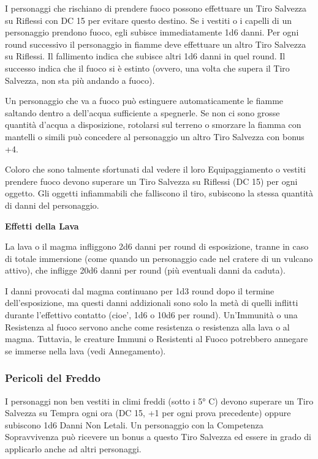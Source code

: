 \documentclass[a4paper,11pt,twoside,openany]{book}
\begin{document}
I personaggi che rischiano di prendere fuoco possono effettuare un Tiro Salvezza su Riflessi con DC 15 per evitare questo destino. Se i vestiti o i capelli di un personaggio prendono fuoco, egli subisce immediatamente 1d6 danni. Per ogni round successivo il personaggio in fiamme deve effettuare un altro Tiro Salvezza su Riflessi. Il fallimento indica che subisce altri 1d6 danni in quel round. Il successo indica che il fuoco si è estinto (ovvero, una volta che supera il Tiro Salvezza, non sta più andando a fuoco).

Un personaggio che va a fuoco può estinguere automaticamente le fiamme saltando dentro a dell'acqua sufficiente a spegnerle. Se non ci sono grosse quantità d'acqua a disposizione, rotolarsi sul terreno o smorzare la fiamma con mantelli o simili può concedere al personaggio un altro Tiro Salvezza con bonus +4.

Coloro che sono talmente sfortunati dal vedere il loro Equipaggiamento o vestiti prendere fuoco devono superare un Tiro Salvezza su Riflessi (DC 15) per ogni oggetto. Gli oggetti infiammabili che falliscono il tiro, subiscono la stessa quantità di danni del personaggio.

\medskip

\textbf{Effetti della Lava}

La lava o il magma infliggono 2d6 danni per round di esposizione, tranne in caso di totale immersione (come quando un personaggio cade nel cratere di un vulcano attivo), che infligge 20d6 danni per round (più eventuali danni da caduta).

I danni provocati dal magma continuano per 1d3 round dopo il termine dell'esposizione, ma questi danni addizionali sono solo la metà di quelli inflitti durante l'effettivo contatto (cioe', 1d6 o 10d6 per round). Un'Immunità o una Resistenza al fuoco servono anche come resistenza o resistenza alla lava o al magma. Tuttavia, le creature Immuni o Resistenti al Fuoco potrebbero annegare se immerse nella lava (vedi Annegamento).


\subsubsection{Pericoli del Freddo}

\label{pericoli-del-freddo}

I personaggi non ben vestiti in climi freddi (sotto i 5° C) devono superare un Tiro Salvezza su Tempra ogni ora (DC 15, +1 per ogni prova precedente) oppure subiscono 1d6 Danni Non Letali. Un personaggio con la Competenza Sopravvivenza può ricevere un bonus a questo Tiro Salvezza ed essere in grado di applicarlo anche ad altri personaggi.
\end{document}
